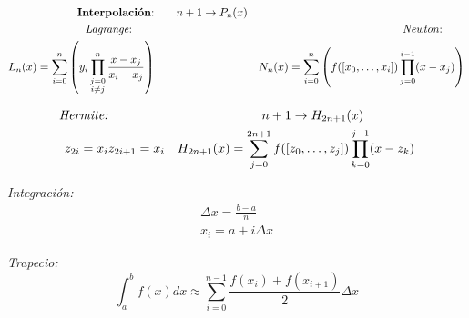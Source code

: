 \documentclass[12pt]{article}
\begin{document}
\begin{align*}
\text{\textbf{Interpolación}:} & \qquad n+1 \rightarrow P_n(x) & \\
  \text{\textit{Lagrange}:} \qquad & \qquad & \text{\textit{Newton}:} \qquad \\
  L_n(x) = \sum_{i=0}^n \left(y_i\prod_{\substack{j=0 \\ i \neq j}}^n \frac{x-x_j}{x_i - x_j}\right) & & N_n(x) = \sum_{i=0}^n \left(f([x_0, \ldots, x_i]) \prod_{j=0}^{i-1}(x-x_j)\right)
\end{align*}

\begin{align*}
\text{\textit{Hermite:}} &  & n+1 \rightarrow H_{2n+1}(x) \qquad \qquad \\
z_{2i} = x_i & z_{2i+1} = x_i & H_{2n+1}(x) = \sum_{j=0}^{2n+1}f([z_0, \ldots, z_j])\prod_{k=0}^{j-1}(x - z_k)
\end{align*}

  \textit{Integración:}
  \begin{eqnarray*}
   \Delta x = \frac{b-a}{n}\\
   x_i = a + i \Delta x
  \end{eqnarray*}

  \textit{Trapecio:}
  $$\int_a^b f(x)dx \approx \sum_{i=0}^{n-1} \frac{f(x_i) + f(x_{i+1})}{2}\Delta x$$
\end{document}
